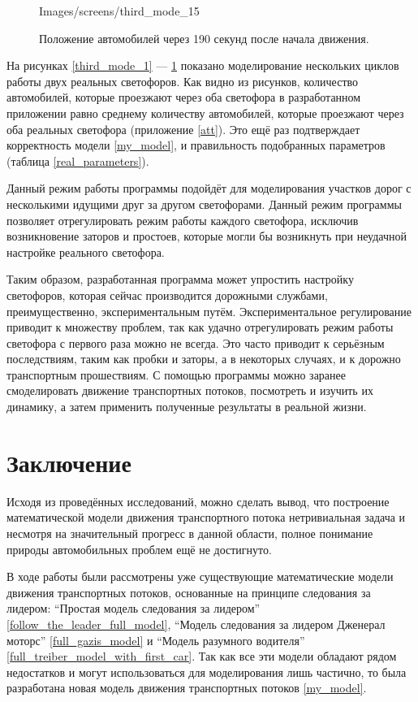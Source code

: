 \documentclass[12pt, a4paper]{extarticle}
\numberwithin{equation}{section}
\numberwithin{figure}{section}
\begin{document}
\begin{figure}[H]
\begin{center}
\begin{minipage}[h]{0.48\linewidth}
			{Images/screens/third_mode_15}
			\caption{Положение автомобилей через 190 секунд после начала движения.}
			\label{third_mode_15}
		\end{minipage}
	\end{center}
\end{figure}

На рисунках \ref{third_mode_1} --- \ref{third_mode_15} показано моделирование нескольких циклов работы двух реальных светофоров. Как видно из рисунков, количество автомобилей, которые проезжают через оба светофора в разработанном приложении равно среднему количеству автомобилей, которые проезжают через оба реальных светофора (приложение \ref{att}). Это ещё раз подтверждает корректность модели \eqref{my_model}, и правильность подобранных параметров (таблица \ref{real_parameters}).

Данный режим работы программы подойдёт для моделирования участков дорог с несколькими идущими друг за другом светофорами. Данный режим программы позволяет отрегулировать режим работы каждого светофора, исключив возникновение заторов и простоев, которые могли бы возникнуть при неудачной настройке реального светофора.  

Таким образом, разработанная программа может упростить настройку светофоров, которая сейчас производится дорожными службами, преимущественно, экспериментальным путём. Экспериментальное регулирование приводит к множеству проблем, так как удачно отрегулировать режим работы светофора с первого раза можно не всегда. Это часто приводит к серьёзным последствиям, таким как пробки и заторы, а в некоторых случаях, и к дорожно транспортным прошествиям. С помощью программы можно заранее смоделировать движение транспортных потоков, посмотреть и изучить их динамику, а затем применить полученные результаты в реальной жизни.

\newpage
\section*{Заключение}
Исходя из проведённых исследований, можно сделать вывод, что построение математической модели  движения транспортного потока нетривиальная задача и несмотря на значительный прогресс в данной области, полное понимание природы автомобильных проблем ещё не достигнуто. 

В ходе работы были рассмотрены уже существующие математические модели движения транспортных потоков, основанные на принципе следования за лидером: ``Простая модель следования за лидером''  \eqref{follow_the_leader_full_model}, ``Модель следования за лидером Дженерал моторс''  \eqref{full_gazis_model} и ``Модель разумного водителя'' \eqref{full_treiber_model_with_first_car}. Так как все эти модели обладают рядом недостатков и могут использоваться для моделирования лишь частично, то была разработана новая модель движения транспортных потоков \eqref{my_model}. 
\end{document}
